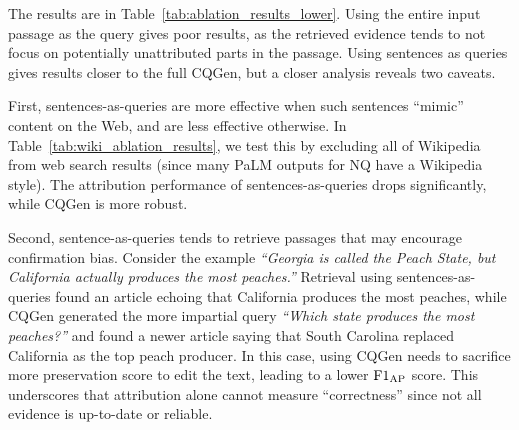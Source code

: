 \documentclass[11pt]{article}
\begin{document}
The results are in Table~\ref{tab:ablation_results_lower}.
Using the entire input passage as the query gives poor results,
as the retrieved evidence tends to not focus on potentially unattributed parts in the passage.
Using sentences as queries gives results closer to the full CQGen, but a closer analysis reveals two caveats.


\begin{table}[!t]
\centering\small
{}
\caption{
\textbf{The impact of excluding Wikipedia from the retrieval corpus.} %
CQGen (full \approach{}) is more robust to Wikipedia's absence, while using sentences-as-queries suffers a bigger drop in performance.}
\label{tab:wiki_ablation_results}
\end{table}


First, sentences-as-queries are more effective when such sentences ``mimic'' content on the Web,
and are less effective otherwise.
In Table~\ref{tab:wiki_ablation_results}, we test this by excluding all of Wikipedia from web search results (since many PaLM outputs for NQ have a Wikipedia style). The attribution performance of sentences-as-queries drops significantly, while CQGen is more robust.

Second, sentence-as-queries tends to retrieve passages that may encourage confirmation bias. 
Consider the example \textit{``Georgia is called the Peach State, but California actually produces the most peaches.''} Retrieval using sentences-as-queries found an article echoing that California produces the most peaches, while CQGen generated the more impartial query \textit{``Which state produces the most peaches?''} and found a newer article saying that South Carolina replaced California as the top peach producer. In this case, \approach{} using CQGen needs to sacrifice more preservation score to edit the text, leading to a lower $\text{F1}_\text{AP}{}$ score. This underscores that attribution alone cannot measure ``correctness'' since not all evidence is up-to-date or reliable.
\end{document}
